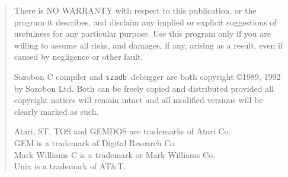 
\title{}
\author{Micha{\l} Jaegermann \\[.6in]
	edited by\\
	Anthony Howe}
\date{14 Jan 1992}

\newcommand{\szadb}{{\tt szadb}}
\newcommand{\adb}{{\tt adb.ttp}}
\newcommand{\name}[1]{{\tt #1}}
\newcommand{\key}[1]{{\sf $\langle$#1$\rangle$}}
\newcommand{\carret}{\char94}
\newlength{\exmpskip}
\setlength{\exmpskip}{2\parindent}
\newenvironment{exmpl}
  {\begin{quote}\setlength{\leftskip}{\parindent}}{\end{quote}}
\newcommand{\readexample}[1]
   {\medskip\inputverbatim[\exmpskip]{#1}\medskip\noindent}

\vfill
\maketitle
\thispagestyle{empty}
\titlepage\null\vfill{\sf 
\begin{quote}
	There is NO WARRANTY with respect to this publication, or the
	program it describes, and disclaim any implied or explicit
	suggestions of usefulness for any particular purpose.  Use
	this program only if you are willing to assume all risks, and
	damages, if any, arising as a result, even if caused by
	negligence or other fault.

\bigskip
	Sozobon C compiler and \szadb\ debugger are both copyright
	\copyright 1989, 1992 by Sozobon Ltd.  Both can be freely copied
	and distributed provided all copyright notices will remain
	intact and all modified versions will be clearly marked as such.

\medskip
	Atari, ST, TOS and GEMDOS are trademarks of Atari Co.\\
	GEM is a trademark of Digital Research Co.\\
	Mark Williams C is a trademark or Mark Williams Co.\\
	{\sc Unix} is a trademark of AT\&T.
\end{quote}
}\par\null\endtitlepage
\sloppy
